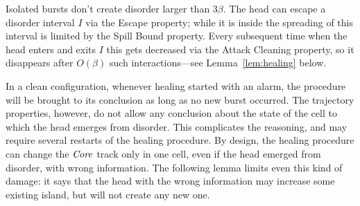 \documentclass[11pt]{memoir}
\theoremstyle{definition} %
\newcommand{\fld}[1]{\ensuremath{\textit{#1\/}}}
\def\B{B}
\newcommand{\Tu}{T}
\newcommand{\Z}{Z}
\newcommand{\Core}{\fld{Core}}
\newcommand{\cns}[1]{c_{\textrm{\upshape #1}}}
\newcommand{\CAtt}{\cns{attack}}
\newcommand{\CEsc}{\cns{esc}}
\newcommand{\CSpill}{\cns{spill}}
\begin{document}
Isolated bursts don't create disorder larger than \( 3\beta \).
The head can escape a disorder interval \( I \) via the Escape property; while it is inside the
spreading of this interval is limited by the Spill Bound property.
Every subsequent time when the head enters and exits \( I \) this gets decreased
via the Attack Cleaning property, so it disappears after \( O(\beta) \) such interactions---see
Lemma~\ref{lem:healing} below.

 
In a clean configuration, whenever healing started with an alarm, the procedure
will be brought to its conclusion as long as no new burst occurred.
The trajectory properties, however, do not allow any conclusion about the
state of the cell to which the head emerges from disorder.
This complicates the reasoning, and may require several restarts of the healing procedure.
By design, the healing procedure can change the \( \Core \) track only in one cell,
even if the head emerged from disorder, with wrong information.
The following lemma limits even this kind of damage:
it says that the head with the wrong information may increase some existing island, but will
not create any new one.
\end{document}

